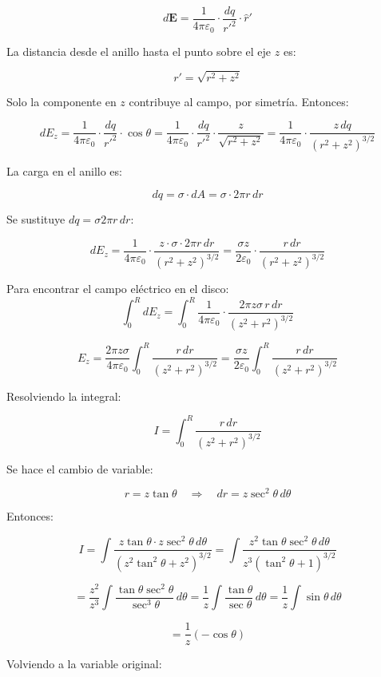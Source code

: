 \documentclass[12pt]{article}
\begin{document}
\[
d\mathbf{E} = \frac{1}{4\pi \varepsilon_0} \cdot \frac{dq}{r'^2} \cdot \hat{r}'
\]

La distancia desde el anillo hasta el punto sobre el eje \( z \) es:

\[
r' = \sqrt{r^2 + z^2}
\]

Solo la componente en \( z \) contribuye al campo, por simetría. Entonces:

\[
dE_z = \frac{1}{4\pi \varepsilon_0} \cdot \frac{dq}{r'^2} \cdot \cos\theta = \frac{1}{4\pi \varepsilon_0} \cdot \frac{dq}{r'^2} \cdot \frac{z}{\sqrt{r^2 + z^2}} = \frac{1}{4\pi \varepsilon_0} \cdot \frac{z \, dq}{(r^2 + z^2)^{3/2}}
\]

La carga en el anillo es:

\[
dq = \sigma \cdot dA = \sigma \cdot 2\pi r \, dr
\]


Se sustituye \( dq = \sigma 2\pi r \, dr \):

\[
dE_z = \frac{1}{4\pi \varepsilon_0} \cdot \frac{z \cdot \sigma \cdot 2\pi r \, dr}{(r^2 + z^2)^{3/2}} = \frac{\sigma z}{2\varepsilon_0} \cdot \frac{r \, dr}{(r^2 + z^2)^{3/2}}
\]

Para encontrar el campo eléctrico en el disco:
\[
\int_0^R dE_z = \int_0^R \frac{1}{4\pi\varepsilon_0} \cdot \frac{2\pi z \sigma \, r \, dr}{(z^2 + r^2)^{3/2}}
\]

\[
E_z = \frac{2\pi z \sigma}{4\pi \varepsilon_0} \int_0^R \frac{r \, dr}{(z^2 + r^2)^{3/2}} = \frac{\sigma z}{2\varepsilon_0} \int_0^R \frac{r \, dr}{(z^2 + r^2)^{3/2}}
\]

Resolviendo la integral:

\[
I = \int_0^R \frac{r \, dr}{(z^2 + r^2)^{3/2}}
\]

Se hace el cambio de variable:

\[
r = z \tan\theta \quad \Rightarrow \quad dr = z \sec^2 \theta \, d\theta
\]

Entonces:

\[
I = \int \frac{z \tan\theta \cdot z \sec^2 \theta \, d\theta}{\left(z^2 \tan^2\theta + z^2\right)^{3/2}}
= \int \frac{z^2 \tan\theta \sec^2 \theta \, d\theta}{z^3 (\tan^2\theta + 1)^{3/2}}
\]

\[
= \frac{z^2}{z^3} \int \frac{\tan\theta \sec^2\theta}{\sec^3\theta} \, d\theta
= \frac{1}{z} \int \frac{\tan\theta}{\sec\theta} \, d\theta
= \frac{1}{z} \int \sin\theta \, d\theta
\]

\[
= \frac{1}{z} (-\cos\theta)
\]

Volviendo a la variable original:
\end{document}
